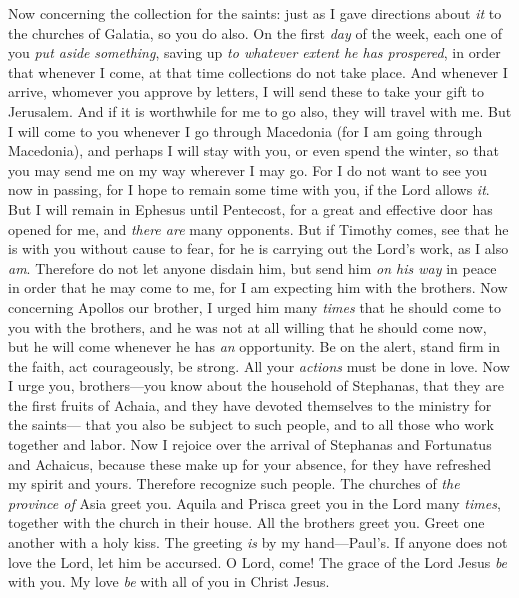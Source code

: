 \begin{biblechapter} %
 Now concerning the collection for the saints: just as I gave directions about \textit{it} to the churches of Galatia, so you do also.
\verse On the first \textit{day} of the week, each one of you \textit{put aside} \textit{something}, saving up \textit{to whatever extent he has prospered}, in order that whenever I come, at that time collections do not take place.
\verse And whenever I arrive, whomever you approve by letters, I will send these to take your gift to Jerusalem.
\verse And if it is worthwhile for me to go also, they will travel with me.
 But I will come to you whenever I go through Macedonia (for I am going through Macedonia),
\verse and perhaps I will stay with you, or even spend the winter, so that you may send me on my way wherever I may go.
\verse For I do not want to see you now in passing, for I hope to remain some time with you, if the Lord allows \textit{it}.
\verse But I will remain in Ephesus until Pentecost,
\verse for a great and effective door has opened for me, and \textit{there are} many opponents.
\verse But if Timothy comes, see that he is with you without cause to fear, for he is carrying out the Lord’s work, as I also \textit{am}.
\verse Therefore do not let anyone disdain him, but send him \textit{on his way} in peace in order that he may come to me, for I am expecting him with the brothers.
\verse Now concerning Apollos our brother, I urged him many \textit{times} that he should come to you with the brothers, and he was not at all willing that he should come now, but he will come whenever he has \textit{an} opportunity.
 Be on the alert, stand firm in the faith, act courageously, be strong.
\verse All your \textit{actions} must be done in love.
\verse Now I urge you, brothers—you know about the household of Stephanas, that they are the first fruits of Achaia, and they have devoted themselves to the ministry for the saints—
\verse that you also be subject to such people, and to all those who work together and labor.
\verse Now I rejoice over the arrival of Stephanas and Fortunatus and Achaicus, because these make up for your absence,
\verse for they have refreshed my spirit and yours. Therefore recognize such people.
 The churches of \textit{the province of} Asia greet you. Aquila and Prisca greet you in the Lord many \textit{times}, together with the church in their house.
\verse All the brothers greet you. Greet one another with a holy kiss.
\verse The greeting \textit{is} by my hand—Paul’s.
\verse If anyone does not love the Lord, let him be accursed. O Lord, come!
\verse The grace of the Lord Jesus \textit{be} with you.
\verse My love \textit{be} with all of you in Christ Jesus.
\end{biblechapter}

